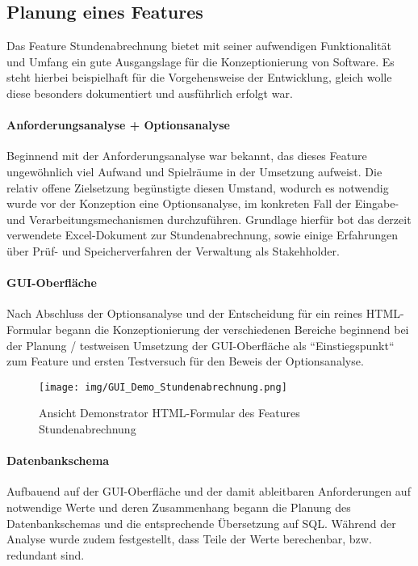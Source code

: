 \documentclass[12pt,a4paper]{scrartcl}
\begin{document}
\subsection{Planung eines Features}

Das Feature Stundenabrechnung bietet mit seiner aufwendigen Funktionalität und Umfang ein gute Ausgangslage für die Konzeptionierung von Software. Es steht hierbei beispielhaft für die Vorgehensweise der Entwicklung, gleich wolle diese besonders dokumentiert und ausführlich erfolgt war.

\paragraph*{Anforderungsanalyse + Optionsanalyse}

Beginnend mit der Anforderungsanalyse war bekannt, das dieses Feature ungewöhnlich viel Aufwand und Spielräume in der Umsetzung aufweist. Die relativ offene Zielsetzung begünstigte diesen Umstand, wodurch es notwendig wurde vor der Konzeption eine Optionsanalyse, im konkreten Fall der Eingabe- und Verarbeitungsmechanismen durchzuführen. Grundlage hierfür bot das derzeit verwendete Excel-Dokument zur Stundenabrechnung, sowie einige Erfahrungen über Prüf- und Speicherverfahren der Verwaltung als Stakehholder.

\paragraph*{GUI-Oberfläche}

Nach Abschluss der Optionsanalyse und der Entscheidung für ein reines HTML-Formular begann die Konzeptionierung der verschiedenen Bereiche beginnend bei der Planung / testweisen Umsetzung der GUI-Oberfläche als “Einstiegspunkt“ zum Feature und ersten Testversuch für den Beweis der Optionsanalyse. 

\begin{figure}[H]
	\centering
	\texttt{[image: img/GUI\_Demo\_Stundenabrechnung.png]}
	\caption{Ansicht Demonstrator HTML-Formular des Features Stundenabrechnung}
	\label{fig:bpmn-process}
\end{figure}

\paragraph*{Datenbankschema}

Aufbauend auf der GUI-Oberfläche und der damit ableitbaren Anforderungen auf notwendige Werte und deren Zusammenhang begann die Planung des Datenbankschemas und die entsprechende Übersetzung auf SQL. Während der Analyse wurde zudem festgestellt, dass Teile der Werte berechenbar, bzw. redundant sind. 
\end{document}
